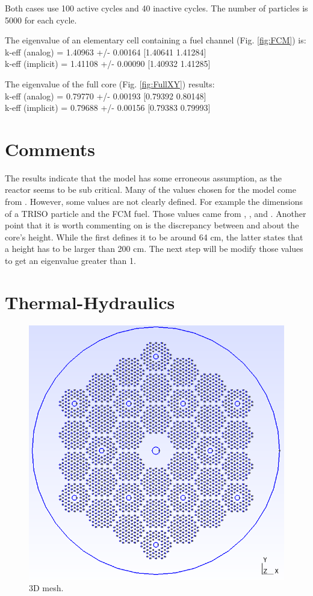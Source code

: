 \documentclass[11pt,letterpaper]{article}
\begin{document}
Both cases use 100 active cycles and 40 inactive cycles. The number of particles is 5000 for each cycle.

The eigenvalue of an elementary cell containing a fuel channel (Fig. \ref{fig:FCM}) is: \\
\noindent
k-eff (analog)    = 1.40963 +/- 0.00164  [1.40641  1.41284]\\
\noindent
k-eff (implicit)  = 1.41108 +/- 0.00090  [1.40932  1.41285]

The eigenvalue of the full core (Fig. \ref{fig:FullXY}) results:\\
\noindent
k-eff (analog)    = 0.79770 +/- 0.00193  [0.79392  0.80148]\\
\noindent
k-eff (implicit)  = 0.79688 +/- 0.00156  [0.79383  0.79993]


\section{Comments}

The results indicate that the model has some erroneous assumption, as the reactor seems to be sub critical.
Many of the values chosen for the model come from \cite{hawari_development_2018}. However, some values are not clearly defined.
For example the dimensions of a TRISO particle and the FCM fuel. Those values came from \cite{powers_fully_2013}, \cite{jo_preliminary_2014}, and \cite{venneri_neutronic_2015}.
Another point that it is worth commenting on is the discrepancy between \cite{hawari_development_2018} and \cite{jo_preliminary_2014} about the core's height. While the first defines it to be around 64 cm, the latter states that a height has to be larger than 200 cm.
The next step will be modify those values to get an eigenvalue greater than 1.

\section{Thermal-Hydraulics}

\begin{figure}[H]
	\centering
	\includegraphics[width=0.5\linewidth]{figures/MMR3D_full.png}
	\hfill
	\caption{3D mesh.}
	\label{fig:gmsh3D}
\end{figure}

\pagebreak


\end{document}
